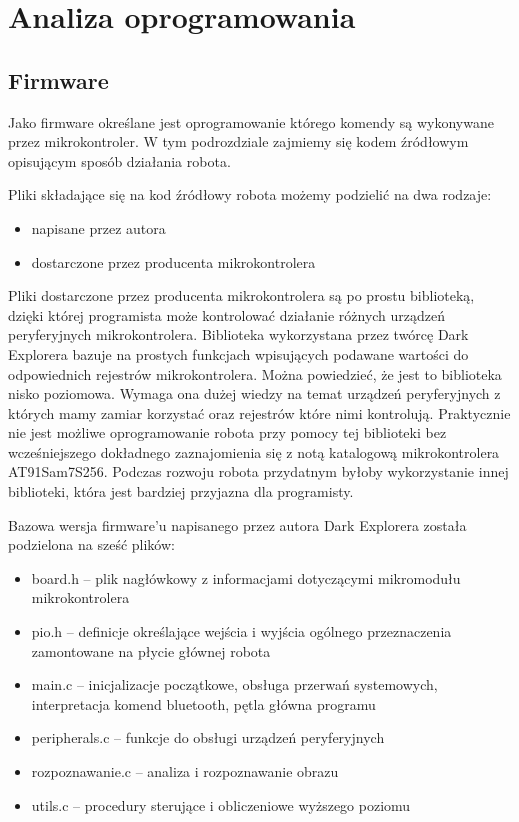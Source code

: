 \section{Analiza oprogramowania}
\subsection{Firmware}
Jako firmware określane jest oprogramowanie którego komendy są wykonywane przez mikrokontroler. W tym podrozdziale zajmiemy się kodem źródłowym opisującym sposób działania robota.

Pliki składające się na kod źródłowy robota możemy podzielić na dwa rodzaje:
\begin{itemize}
 \item napisane przez autora
 \item dostarczone przez producenta mikrokontrolera
\end{itemize}

Pliki dostarczone przez producenta mikrokontrolera są po prostu biblioteką, dzięki której programista może kontrolować działanie różnych urządzeń peryferyjnych mikrokontrolera. Biblioteka wykorzystana przez twórcę Dark Explorera bazuje na prostych funkcjach wpisujących podawane wartości do odpowiednich rejestrów mikrokontrolera. Można powiedzieć, że jest to biblioteka nisko poziomowa. Wymaga ona dużej wiedzy na temat urządzeń peryferyjnych z których mamy zamiar korzystać oraz rejestrów które nimi kontrolują. Praktycznie nie jest możliwe oprogramowanie robota przy pomocy tej biblioteki bez wcześniejszego dokładnego zaznajomienia się z notą katalogową mikrokontrolera AT91Sam7S256. Podczas rozwoju robota przydatnym byłoby wykorzystanie innej biblioteki, która jest bardziej przyjazna dla programisty.

Bazowa wersja firmware'u napisanego przez autora Dark Explorera została podzielona na sześć plików:
\begin{itemize}
 \item board.h -- plik nagłówkowy z informacjami dotyczącymi mikromodułu mikrokontrolera
 \item pio.h -- definicje określające wejścia i wyjścia ogólnego przeznaczenia zamontowane na płycie głównej robota
 \item main.c -- inicjalizacje początkowe, obsługa przerwań systemowych, interpretacja komend bluetooth, pętla główna programu
 \item peripherals.c -- funkcje do obsługi urządzeń peryferyjnych
 \item rozpoznawanie.c -- analiza i rozpoznawanie obrazu
 \item utils.c -- procedury sterujące i obliczeniowe wyższego poziomu
\end{itemize}

